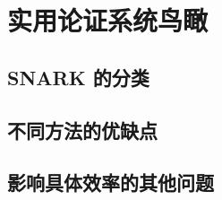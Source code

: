 \chapter{实用论证系统鸟瞰}\label{chp:19SNARK}

\section{SNARK 的分类}\label{19.1}
\section{不同方法的优缺点}\label{19.2}
\section{影响具体效率的其他问题}\label{19.3}

